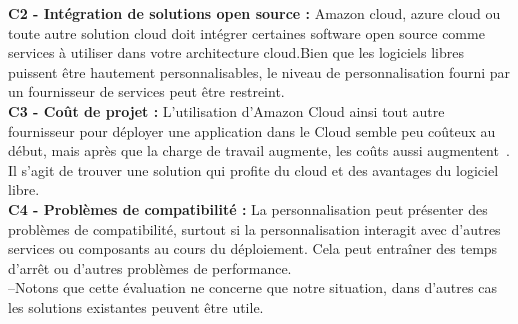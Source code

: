 \noindent \textbf{\Large C2 - Intégration de solutions open source : }\textsf{\selectfont{} Amazon cloud, azure cloud ou toute autre solution cloud doit intégrer certaines software open source comme services à utiliser dans votre architecture cloud.Bien que les logiciels libres puissent être hautement personnalisables, le niveau de personnalisation fourni par un fournisseur de services peut être restreint. }\\[0.1cm]
\noindent \textbf{\Large C3 - Coût de projet : }\textsf{\selectfont{}  L'utilisation d'Amazon Cloud ainsi tout autre fournisseur pour  déployer une application dans le Cloud semble peu coûteux au début, mais après que la charge de travail augmente, les coûts aussi augmentent . Il s'agit de trouver une solution qui profite du cloud et des avantages du logiciel libre.}\\[0.1cm]
\noindent \textbf{\Large C4 - Problèmes de compatibilité : }\textsf{\selectfont{} La personnalisation peut présenter des problèmes de compatibilité, surtout si la personnalisation interagit avec d'autres services ou composants au cours du déploiement. Cela peut entraîner des temps d’arrêt ou d’autres problèmes de performance.}\\[0.5cm]
\textsf{\selectfont{} --Notons que cette évaluation ne concerne que notre situation, dans d'autres cas les solutions existantes peuvent être utile.  }


